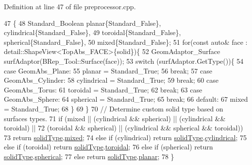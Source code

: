 Definition at line 47 of file preprocessor.\+cpp.


\begin{DoxyCode}
47                                                                            \{
48     Standard\_Boolean planar\{Standard\_False\}, cylindrical\{Standard\_False\},
49                      toroidal\{Standard\_False\}, spherical\{Standard\_False\},
50                      mixed\{Standard\_False\};
51     \textcolor{keywordflow}{for}(\textcolor{keyword}{const} \textcolor{keyword}{auto}& face : detail::ShapeView<TopAbs\_FACE>\{solid\})\{
52         GeomAdaptor\_Surface surfAdaptor(BRep\_Tool::Surface(face));
53         \textcolor{keywordflow}{switch} (surfAdaptor.GetType())\{
54         \textcolor{keywordflow}{case}  GeomAbs\_Plane:
55             planar = Standard\_True;
56             \textcolor{keywordflow}{break};
57         \textcolor{keywordflow}{case} GeomAbs\_Cylinder:
58             cylindrical = Standard\_True;
59             \textcolor{keywordflow}{break};
60         \textcolor{keywordflow}{case} GeomAbs\_Torus:
61             toroidal = Standard\_True;
62             \textcolor{keywordflow}{break};
63         \textcolor{keywordflow}{case} GeomAbs\_Sphere:
64             spherical = Standard\_True;
65             \textcolor{keywordflow}{break};
66         \textcolor{keywordflow}{default}:
67             mixed = Standard\_True;
68         \}
69     \}
70     \textcolor{comment}{// Determine custom solid type based on surfaces types.}
71     \textcolor{keywordflow}{if} (mixed || (cylindrical && spherical) || (cylindrical && toroidal) ||
72             (toroidal && spherical) || (cylindrical && spherical && toroidal))
73         \textcolor{keywordflow}{return} \hyperlink{classMcCAD_1_1Decomposition_1_1Preprocessor_a556f8a0b05725f3c17f828fb4c23e9a9}{solidType}.\hyperlink{classMcCAD_1_1Tools_1_1SolidType_a69c62abbe9fa709ccbaf47d4daf356e1a506dbe9f789bfe40322100b59064e521}{mixed};
74     \textcolor{keywordflow}{else} \textcolor{keywordflow}{if} (cylindrical) \textcolor{keywordflow}{return} \hyperlink{classMcCAD_1_1Decomposition_1_1Preprocessor_a556f8a0b05725f3c17f828fb4c23e9a9}{solidType}.\hyperlink{classMcCAD_1_1Tools_1_1SolidType_a69c62abbe9fa709ccbaf47d4daf356e1aed38f6feaeb26f0baf2614a0d421b638}{cylindrical};
75     \textcolor{keywordflow}{else} \textcolor{keywordflow}{if} (toroidal) \textcolor{keywordflow}{return} \hyperlink{classMcCAD_1_1Decomposition_1_1Preprocessor_a556f8a0b05725f3c17f828fb4c23e9a9}{solidType}.\hyperlink{classMcCAD_1_1Tools_1_1SolidType_a69c62abbe9fa709ccbaf47d4daf356e1ad9493def4181ec95fec305f92c8ba5f0}{toroidal};
76     \textcolor{keywordflow}{else} \textcolor{keywordflow}{if} (spherical) \textcolor{keywordflow}{return} \hyperlink{classMcCAD_1_1Decomposition_1_1Preprocessor_a556f8a0b05725f3c17f828fb4c23e9a9}{solidType}.\hyperlink{classMcCAD_1_1Tools_1_1SolidType_a69c62abbe9fa709ccbaf47d4daf356e1aab73308273ab560262a29dbc877d5806}{spherical};
77     \textcolor{keywordflow}{else} \textcolor{keywordflow}{return} \hyperlink{classMcCAD_1_1Decomposition_1_1Preprocessor_a556f8a0b05725f3c17f828fb4c23e9a9}{solidType}.\hyperlink{classMcCAD_1_1Tools_1_1SolidType_a69c62abbe9fa709ccbaf47d4daf356e1a03cc49496c89d07ea5f8ef75c4912243}{planar};
78 \}
\end{DoxyCode}
